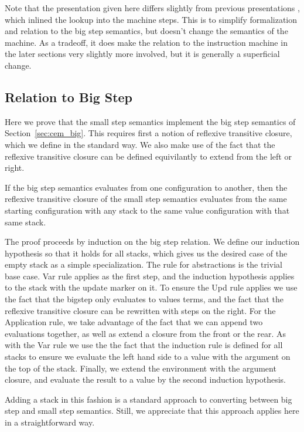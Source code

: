 Note that the presentation given here differs slightly from previous
presentations \cite{cem}, which inlined the lookup into the machine steps. This
is to simplify formalization and relation to the big step semantics, but doesn't
change the semantics of the machine. As a tradeoff, it does make the relation to
the instruction machine in the later sections very slightly more involved, but
it is generally a superficial change.

\subsection{Relation to Big Step}
Here we prove that the small step semantics implement the big step semantics of
Section~\ref{sec:cem_big}. This requires first a notion of reflexive transitive closure,
which we define in the standard way. We also make use of the fact that the
reflexive transitive closure can be defined equivilantly to extend from the left
or right. 

\begin{lemma}
If the big step semantics evaluates from one configuration to another, then the
reflexive transitive closure of the small step semantics evaluates from the same
starting configuration with any stack to the same value configuration with that
same stack.
\end{lemma}
\begin{proofoutline}
The proof proceeds by induction on the big step relation. We define our
induction hypothesis so that it holds for all stacks, which gives us the
desired case of the empty stack as a simple specialization. The rule for
abstractions is the trivial base case. Var rule applies as the first step, and
the induction hypothesis applies to the stack with the update marker on it. To
ensure the Upd rule applies we use the fact that the bigstep only evaluates to
values terms, and the fact that the reflexive transitive closure can be
rewritten with steps on the right. For the Application rule, we take advantage
of the fact that we can append two evaluations together, as well as extend a
closure from the front or the rear. As with the Var rule we use the the fact
that the induction rule is defined for all stacks to ensure we evaluate the left
hand side to a value with the argument on the top of the stack.  Finally, we
extend the environment with the argument closure, and evaluate the result to a
value by the second induction hypothesis.   
\end{proofoutline}

Adding a stack in this fashion is a standard approach to converting between big
step and small step semantics. Still, we appreciate that this approach applies
here in a straightforward way. 
